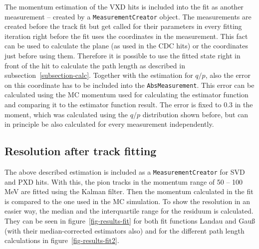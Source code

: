 The momentum estimation of the VXD hits is included into the fit as another measurement -- created by a \texttt{MeasurementCreator} object. The measurements are created before the track fit but get called for their parameters in every fitting iteration right before the fit uses the coordinates in the measurement. This fact can be used to calculate the plane (as used in the CDC hits) or the coordinates just before using them. Therefore it is possible to use the fitted state right in front of the hit to calculate the path length as described in subsection~\ref{subsection-calc}. Together with the estimation for $q/p$, also the error on this coordinate has to be included into the \texttt{AbsMeasurement}. This error can be calculated using the MC momentum used for calculating the estimator function and comparing it to the estimator function result. The error is fixed to 0.3 in the moment, which was calculated using the $q/p$ distribution shown before, but can in principle be also calculated for every measurement independently.

\subsection{Resolution after track fitting}

The above described estimation is included as a \texttt{MeasurementCreator} for SVD and PXD hits. With this, the pion tracks in the momentum range of 50 -- 100 MeV are fitted using the Kalman filter. Then the momentum calculated in the fit is compared to the one used in the MC simulation. To show the resolution in an easier way, the median and the interquartile range for the residuum is calculated. They can be seen in figure~\ref{fig-results-fit} for both fit functions Landau and Gauß (with their median-corrected estimators also) and for the different path length calculations in figure~\ref{fig-results-fit2}.

